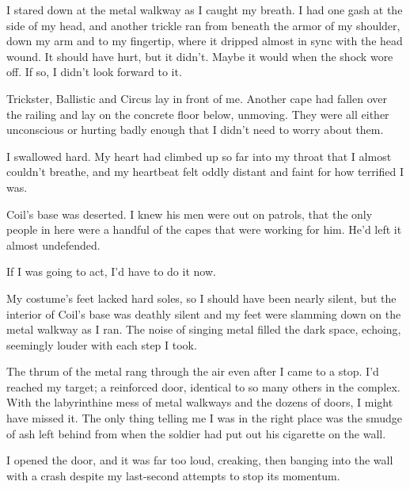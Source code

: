 





I stared down at the metal walkway as I caught my breath.  I had one gash at the side of my head, and another trickle ran from beneath the armor of my shoulder, down my arm and to my fingertip, where it dripped almost in sync with the head wound.  It should have hurt, but it didn't.  Maybe it would when the shock wore off.  If so, I didn't look forward to it.



Trickster, Ballistic and Circus lay in front of me.  Another cape had fallen over the railing and lay on the concrete floor below, unmoving.  They were all either unconscious or hurting badly enough that I didn't need to worry about them.



I swallowed hard.  My heart had climbed up so far into my throat that I almost couldn't breathe, and my heartbeat felt oddly distant and faint for how terrified I was.



Coil's base was deserted.  I knew his men were out on patrols, that the only people in here were a handful of the capes that were working for him.  He'd left it almost undefended.



If I was going to act, I'd have to do it now.



My costume's feet lacked hard soles, so I should have been nearly silent, but the interior of Coil's base was deathly silent and my feet were slamming down on the metal walkway as I ran.  The noise of singing metal filled the dark space, echoing, seemingly louder with each step I took.



The thrum of the metal rang through the air even after I came to a stop.  I'd reached my target; a reinforced door, identical to so many others in the complex.  With the labyrinthine mess of metal walkways and the dozens of doors, I might have missed it.  The only thing telling me I was in the right place was the smudge of ash left behind from when the soldier had put out his cigarette on the wall.



I opened the door, and it was far too loud, creaking, then banging into the wall with a crash despite my last-second attempts to stop its momentum.



